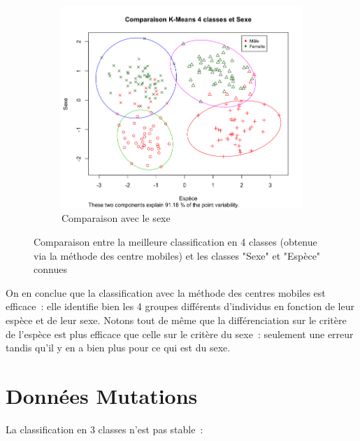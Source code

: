 \documentclass[a4paper,10pt]{report}
\begin{document}
\begin{figure}[H]
\begin{subfigure}[b]{0.5\linewidth}
		\includegraphics[width=1\linewidth]{img/3-2-2-crabs-kmeans-4-classes-sexe}
		\caption{\small Comparaison avec le sexe}
		\label{fig:3-2-2-crabs-kmeans-4-classes-sexe}
	\end{subfigure}%
	\caption{\small Comparaison entre la meilleure classification en 4 classes (obtenue via la méthode des centre mobiles) et les classes "Sexe" et "Espèce" connues}
	\label{fig:3-2-1-Crabs-kmeans-4-classes}
\end{figure}


On en conclue que la classification avec la méthode des centres mobiles est efficace~: elle identifie bien les 4 groupes différents d'individus en fonction de leur espèce et de leur sexe. Notons tout de même que la différenciation sur le critère de l'espèce est plus efficace que celle sur le critère du sexe~: seulement une erreur tandis qu'il y en a bien plus pour ce qui est du sexe.




\section{Données Mutations}





La classification en 3 classes n'est pas stable~:
\end{document}
